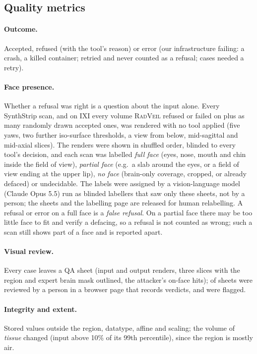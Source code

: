 \documentclass[11pt]{article}
\newcommand{\rv}{\textsc{RadVeil}}
\begin{document}
\subsection{Quality metrics}
\paragraph{Outcome.} Accepted, refused (with the tool's reason) or error
(our infrastructure failing: a crash, a killed container; retried and never
counted as a refusal; \retriedCases{} cases needed a retry).
\paragraph{Face presence.} Whether a refusal was right is a question about
the input alone. Every SynthStrip scan, and on IXI every volume \rv{} refused
or failed on plus as many randomly drawn accepted ones, was rendered with no
tool applied (five yaws, two further iso-surface thresholds, a view from
below, mid-sagittal and mid-axial slices). The renders were shown in
shuffled order, blinded to every tool's decision, and each scan was labelled
\emph{full face} (eyes, nose, mouth and chin inside the field of view),
\emph{partial face} (e.g.\ a slab around the eyes, or a field of view ending
at the upper lip), \emph{no face} (brain-only coverage, cropped, or already
defaced) or undecidable. The labels were assigned by a vision-language model
(Claude Opus 5.5) run as blinded labellers that saw only these sheets, not
by a person; the sheets and the labelling page are released for human
relabelling. A refusal or error on a full face is a \emph{false refusal}. On
a partial face there may be too little face to fit and verify a defacing, so
a refusal is not counted as wrong; such a scan still shows part of a face
and is reported apart.
\paragraph{Visual review.} Every case leaves a QA sheet (input and output
renders, three slices with the region and expert brain mask outlined, the
attacker's on-face hits); \qaReviewed{} of \qaSheets{} sheets were reviewed by
a person in a browser page that records verdicts, and \qaFlagged{} were
flagged.
\paragraph{Integrity and extent.} Stored values outside the region,
datatype, affine and scaling; the volume of \emph{tissue} changed (input
above 10\% of its 99th percentile), since the region is mostly air.
\end{document}
